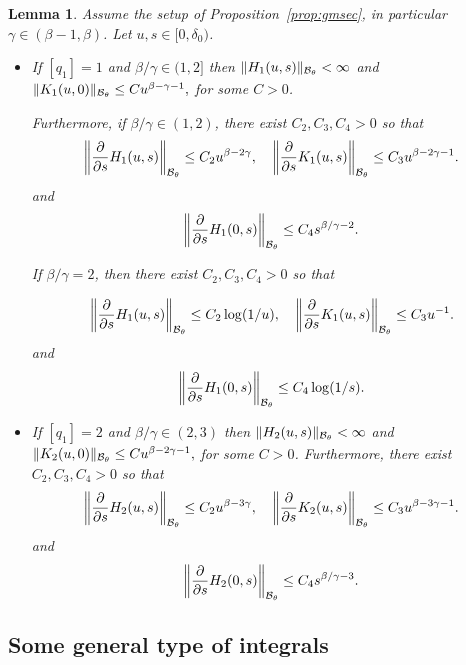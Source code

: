 \documentclass[12pt]{article}
\numberwithin{equation}{section}
\newtheorem{lemma}[thm]{Lemma}
\begin{document}
\begin{lemma}\label{lemma:ref} Assume the setup of Proposition~\ref{prop:gmsec}, in particular $\gamma \in (\beta-1,\beta)$.
Let $u, s\in [0, \delta_0)$. 
\begin{itemize}
\item[(i)] If $[q_1]=1$ and $\beta/\gamma\in (1,2]$ then
 $\|H_{1}(u,s)\|_{\mathcal{B}_\theta} < \infty$ and
  \(
  \|K_{1}(u,0)\|_{\mathcal{B}_\theta}\le C u^{\beta-\gamma-1},
   \)
   for some $C>0$. 
   
   Furthermore, if $\beta/\gamma\in (1,2)$, there exist $ C_2, C_3, C_4>0$ so that
  \[
  \left\|\frac{\partial}{\partial s}H_{1}(u,s)\right\|_{\mathcal{B}_\theta}\le C_2 u^{\beta-2\gamma},\quad  \left\|\frac{\partial}{\partial s}K_{1}(u,s)\right\|_{\mathcal{B}_\theta}\le C_3 u^{\beta-2\gamma-1}.
   \]
   and
   \[
  \left\|\frac{\partial}{\partial s}H_{1}(0,s)\right\|_{\mathcal{B}_\theta}\le C_4 s^{\beta/\gamma-2}.
   \]   
   
   If $\beta/\gamma=2$, then there exist $C_2, C_3, C_4>0$ so that
   
   \[
  \left\|\frac{\partial}{\partial s}H_{1}(u,s)\right\|_{\mathcal{B}_\theta}\le C_2 \log(1/u),\quad  \left\|\frac{\partial}{\partial s}K_{1}(u,s)\right\|_{\mathcal{B}_\theta}\le C_3 u^{-1}.
   \]
   and
   \[
  \left\|\frac{\partial}{\partial s}H_{1}(0,s)\right\|_{\mathcal{B}_\theta}\le C_4 \log(1/s).
   \]     

\item[(ii)] If $[q_1]=2$ and $\beta/\gamma\in (2,3)$ then
 $\|H_{2}(u,s)\|_{\mathcal{B}_\theta} < \infty$ and
  \(
  \|K_{2}(u,0)\|_{\mathcal{B}_\theta}\le C u^{\beta-2\gamma-1},
   \)
   for some $C>0$. Furthermore, there exist $C_2, C_3, C_4>0$ so that
  \[
 \left \|\frac{\partial}{\partial s}H_{2}(u,s)\right\|_{\mathcal{B}_\theta}\le C_2 u^{\beta-3\gamma},\quad  \left\|\frac{\partial}{\partial s}K_{2}(u,s)\right\|_{\mathcal{B}_\theta}\le C_3 u^{\beta-3\gamma-1}.
   \] 
   and
   \[
  \left\|\frac{\partial}{\partial s}H_{2}(0,s)\right\|_{\mathcal{B}_\theta}\le C_4 s^{\beta/\gamma-3}.
   \]    \end{itemize}
\end{lemma}

\subsection{Some general type of integrals}
\label{sec:integr}
\end{document}
